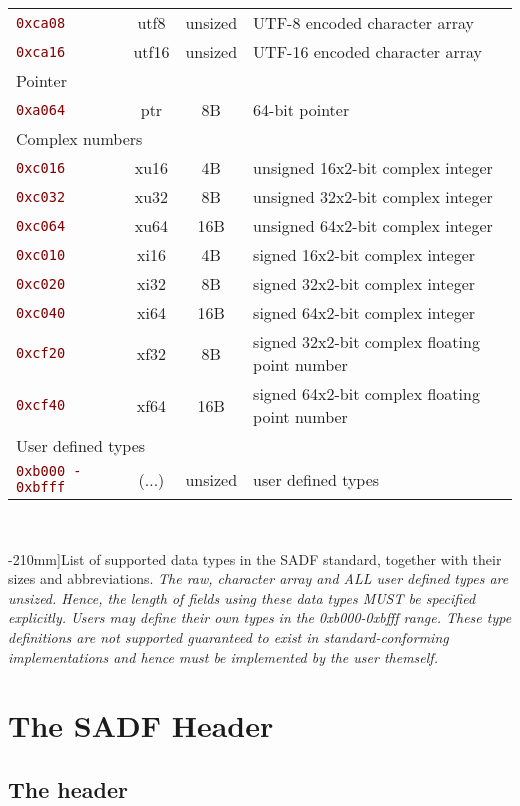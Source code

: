 \documentclass[pagesize=a4]{tufte-book}
\makeatletter
\newcommand{\hex}[1]{\hlred{\texttt{#1}}\label{clsopt:#1}\index{#1 class option@\texttt{#1} class option}\index{class options!#1@\texttt{#1}}}%
\newcommand{\hlred}[1]{\textcolor{Maroon}{#1}}%
\makeatother
\begin{document}
\begin{table*}[ht]
\begin{tabular}{lccl}
		\quad \hex{0xca08} & utf8 & unsized & UTF-8 encoded character array\\
		\quad \hex{0xca16} & utf16 & unsized & UTF-16 encoded character array\\
		\multicolumn{4}{l}{Pointer}\\
		\quad \hex{0xa064} & ptr & 8B & 64-bit pointer\\
		\multicolumn{4}{l}{Complex numbers}\\
		\quad \hex{0xc016} & xu16 & 4B & unsigned 16x2-bit complex integer\\
		\quad \hex{0xc032} & xu32 & 8B & unsigned 32x2-bit complex integer\\
		\quad \hex{0xc064} & xu64 & 16B & unsigned 64x2-bit complex integer\\
		\quad \hex{0xc010} & xi16 & 4B & signed 16x2-bit complex integer\\
		\quad \hex{0xc020} & xi32 & 8B & signed 32x2-bit complex integer\\
		\quad \hex{0xc040} & xi64 & 16B & signed 64x2-bit complex integer\\
		\quad \hex{0xcf20} & xf32 & 8B & signed 32x2-bit complex floating point number\\
		\quad \hex{0xcf40} & xf64 & 16B & signed 64x2-bit complex floating point number\\
		\multicolumn{4}{l}{User defined types}\\
		\quad \hex{0xb000 - 0xbfff} & (...) & unsized & user defined types\\
		\bottomrule
	\end{tabular}
	~\label{tab:data_type_codes}
	\caption[List of supported data types in the SADF standard, together with
	their sizes and abbreviations.][-210mm]{List of supported data types in the SADF standard, together with their sizes and abbreviations.\emph{ The raw, character array and ALL user defined types are unsized. Hence, the length of fields using these data types MUST be specified explicitly. Users may define their own types in the 0xb000-0xbfff range. These type definitions are not supported guaranteed to exist in standard-conforming implementations and hence must be implemented by the user themself.}}
\end{table*}

\chapter{The SADF Header}

\section{The header}
\end{document}
